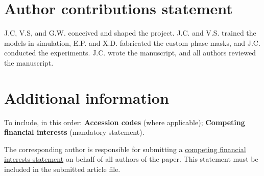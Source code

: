 \documentclass[fleqn,10pt]{wlscirep}
\begin{document}
\section*{Author contributions statement}
J.C, V.S, and G.W. conceived and shaped the project. J.C. and V.S. trained the models in simulation, E.P. and X.D. fabricated the custom phase masks, and J.C. conducted the experiments. J.C. wrote the manuscript, and all authors reviewed the manuscript. 

\section*{Additional information}

To include, in this order: \textbf{Accession codes} (where applicable); \textbf{Competing financial interests} (mandatory statement). 

The corresponding author is responsible for submitting a \href{http://www.nature.com/srep/policies/index.html#competing}{competing financial interests statement} on behalf of all authors of the paper. This statement must be included in the submitted article file.
\end{document}

